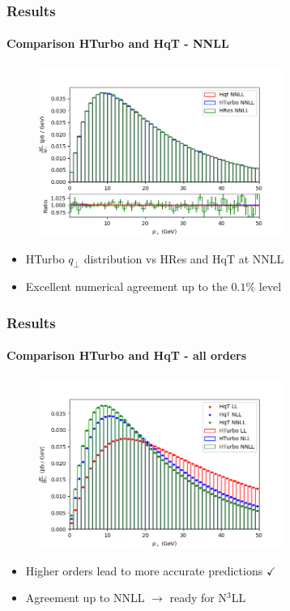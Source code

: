 \documentclass[aspectratio=43]{beamer}
\begin{document}
\begin{frame}

	\frametitle{Results}
	\framesubtitle{Comparison HTurbo and HqT - NNLL}
	
	\begin{figure}
		\includegraphics[width = 8cm]{plots/hturbo_NNLL.png}
	\end{figure}
	
	\begin{itemize}
		\item HTurbo $q_{\perp}$ distribution vs HRes and HqT at NNLL
		\item Excellent numerical agreement up to the $0.1\%$ level
\end{itemize}

\end{frame}

\begin{frame}
	
	\frametitle{Results}
	\framesubtitle{Comparison HTurbo and HqT - all orders}
	
	\begin{figure}
		\includegraphics[width = 8cm]{plots/hturbo_all_orders.png}
	\end{figure}
	
	\begin{itemize}
		\item Higher orders lead to more accurate predictions {\color{darkgreen}$\checkmark$} 
		\item Agreement up to NNLL $\longrightarrow$ {\color{blue}ready for N$^{3}$LL}
	\end{itemize}

\end{frame}
\end{document}
